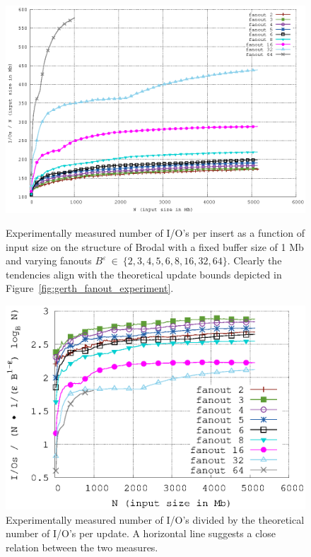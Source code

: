 \documentclass[twoside,11pt,openright]{report}
\def \epsilon {\varepsilon}
\begin{document}
\begin{figure}[h]
\centering
\includegraphics[width=\textwidth]{../src/experiments/gerth_fanout_experiment_results/2016-05-06.11_52_24/ios}
\caption{Experimentally measured number of I/O's per insert as a function of input size on the structure of Brodal with a fixed buffer size of 1 Mb and varying fanouts $B^\epsilon~\in~\{2,3,4,5,6,8,16,32,64\}$. Clearly the tendencies align with the theoretical update bounds depicted in Figure~\ref{fig:gerth_fanout_experiment}.}
\label{fig:gerth_fanout_experiment_ios}
\begin{minipage}[t]{0.48\columnwidth}
  \centering
  \includegraphics[width=\linewidth]{../src/experiments/gerth_fanout_experiment_results/2016-05-06.11_52_24/ios_divided_asymptotic}
  \caption{Experimentally measured number of I/O's divided by the theoretical number of I/O's per update. A horizontal line suggests a close relation between the two measures.}

\end{minipage}
\end{figure}
\end{document}
